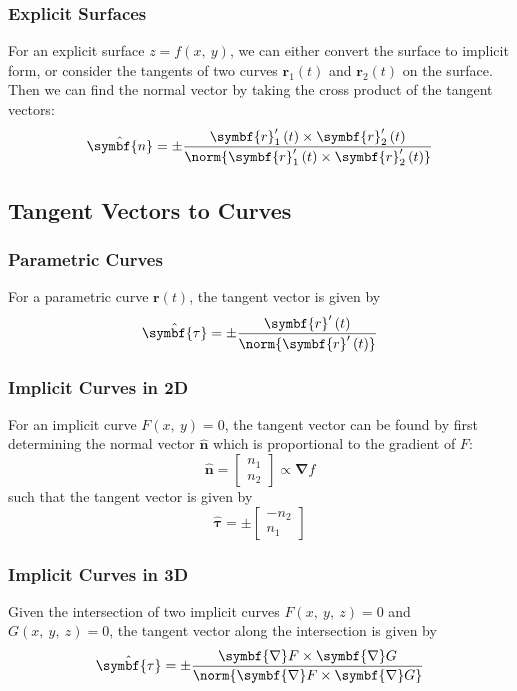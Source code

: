 \documentclass{article}
\begin{document}
\subsubsection{Explicit Surfaces}
For an explicit surface \(z = f\left( x,\: y \right)\), we can either
convert the surface to implicit form, or consider the tangents of two
curves \(\symbf{r}_1\left( t \right)\) and \(\symbf{r}_2\left( t
\right)\) on the surface. Then we can find the normal vector by taking
the cross product of the tangent vectors:
\begin{equation*}
    \hat{\symbf{n}} = \pm \frac{\symbf{r}_1'\left( t \right) \times \symbf{r}_2'\left( t \right)}{\norm{\symbf{r}_1'\left( t \right) \times \symbf{r}_2'\left( t \right)}}
\end{equation*}
\subsection{Tangent Vectors to Curves}
\subsubsection{Parametric Curves}
For a parametric curve \(\symbf{r}\left( t \right)\), the tangent
vector is given by
\begin{equation*}
    \hat{\symbf{\tau}} = \pm \frac{\symbf{r}'\left( t \right)}{\norm{\symbf{r}'\left( t \right)}}
\end{equation*}
\subsubsection{Implicit Curves in 2D}
For an implicit curve \(F\left( x,\: y \right) = 0\), the tangent
vector can be found by first determining the normal vector
\(\hat{\symbf{n}}\) which is proportional to the gradient of \(F\):
\begin{equation*}
    \hat{\symbf{n}} =
    \begin{bmatrix}
        n_1 \\
        n_2
    \end{bmatrix}
    \propto \symbf{\nabla} f
\end{equation*}
such that the tangent vector is given by
\begin{equation*}
    \hat{\symbf{\tau}} = \pm
    \begin{bmatrix}
        -n_2 \\
        n_1
    \end{bmatrix}
\end{equation*}
\subsubsection{Implicit Curves in 3D}
Given the intersection of two implicit curves \(F\left( x,\: y,\: z
\right) = 0\) and \(G\left( x,\: y,\: z \right) = 0\), the tangent
vector along the intersection is given by
\begin{equation*}
    \hat{\symbf{\tau}} = \pm \frac{\symbf{\nabla} F \times \symbf{\nabla} G}{\norm{\symbf{\nabla} F \times \symbf{\nabla} G}}
\end{equation*}
\end{document}
